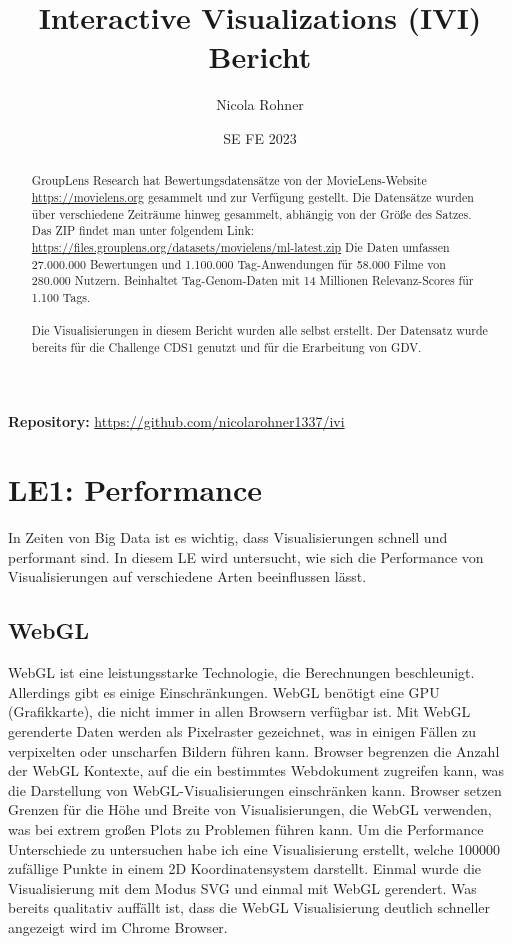 \documentclass{article}
\title{Interactive Visualizations (IVI) Bericht}
\author{Nicola Rohner}
\date{SE FE 2023}
\begin{document}
\maketitle

\begin{center}
\textbf{Repository:} \url{https://github.com/nicolarohner1337/ivi}
\end{center}

\begin{abstract}

GroupLens Research hat Bewertungsdatensätze von der MovieLens-Website \url{https://movielens.org} gesammelt und zur Verfügung gestellt.
Die Datensätze wurden über verschiedene Zeiträume hinweg gesammelt, abhängig von der Größe des Satzes. Das ZIP findet man unter folgendem Link: \url{https://files.grouplens.org/datasets/movielens/ml-latest.zip}
Die Daten umfassen 27.000.000 Bewertungen und 1.100.000 Tag-Anwendungen für 58.000 Filme von 280.000 Nutzern. Beinhaltet Tag-Genom-Daten mit 14 Millionen Relevanz-Scores für 1.100 Tags.\\
\noindent\\
Die Visualisierungen in diesem Bericht wurden alle selbst erstellt. 
Der Datensatz wurde bereits für die Challenge CDS1 genutzt und für die Erarbeitung von GDV.
\end{abstract}

\tableofcontents

\newpage

\section{LE1: Performance}
In Zeiten von Big Data ist es wichtig, dass Visualisierungen schnell und performant sind. In diesem LE wird untersucht, wie sich die Performance von Visualisierungen auf verschiedene Arten beeinflussen lässt.


\subsection{WebGL}
WebGL ist eine leistungsstarke Technologie, die Berechnungen beschleunigt. Allerdings gibt es einige Einschränkungen.
WebGL benötigt eine GPU (Grafikkarte), die nicht immer in allen Browsern verfügbar ist.
Mit WebGL gerenderte Daten werden als Pixelraster gezeichnet, was in einigen Fällen zu verpixelten oder unscharfen Bildern führen kann.
Browser begrenzen die Anzahl der WebGL Kontexte, auf die ein bestimmtes Webdokument zugreifen kann, was die Darstellung von WebGL-Visualisierungen einschränken kann.
Browser setzen Grenzen für die Höhe und Breite von Visualisierungen, die WebGL verwenden, was bei extrem großen Plots zu Problemen führen kann.\cite{plotly_webgl_nodate}
\newline
\newline
Um die Performance Unterschiede zu untersuchen habe ich eine Visualisierung erstellt, welche 100000 zufällige Punkte in einem 2D Koordinatensystem darstellt.
Einmal wurde die Visualisierung mit dem Modus SVG und einmal mit WebGL gerendert. Was bereits qualitativ auffällt ist, dass die WebGL Visualisierung deutlich schneller angezeigt wird im Chrome Browser.
\end{document}
